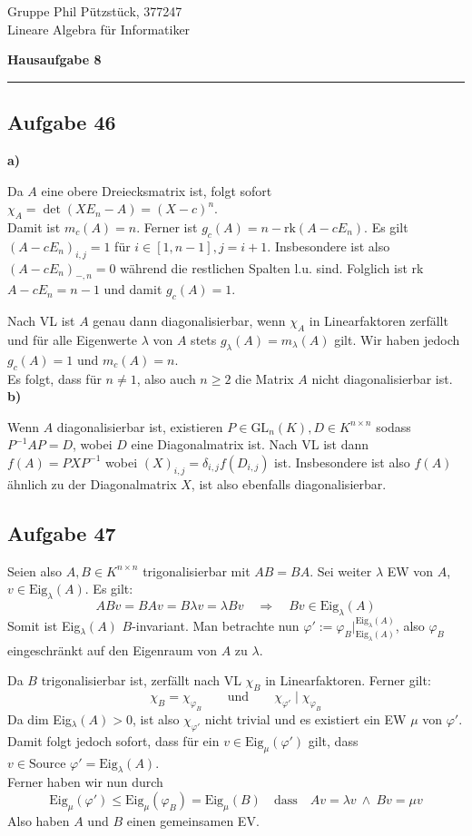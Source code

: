 \documentclass[a4paper,graphics,11pt]{article}
\newcommand{\aufgabe}[1]{\subsection*{Aufgabe #1}}
\begin{document}
\noindent Gruppe              \hfill Phil Pützstück, 377247\\
\noindent Lineare Algebra für Informatiker\\
\begin{center}
	\LARGE{\textbf{Hausaufgabe 8}}
\end{center}
\begin{center}
\rule[0.1ex]{\textwidth}{1pt}
\end{center}



\aufgabe{46}
\textbf{a)}

Da $A$ eine obere Dreiecksmatrix ist, folgt sofort $\chi_A = \det(XE_n - A) = (X-c)^n$.\\
Damit ist $m_c(A) = n$. Ferner ist $g_c(A) = n - \text{rk}(A - cE_n)$.
Es gilt $(A-cE_n)_{i,j} = 1$ für $i \in [1,n-1], j=i+1$. Insbesondere
ist also $(A-cE_n)_{-,n} = 0$ während die restlichen Spalten l.u. sind.
Folglich ist rk $A-cE_n = n-1$ und damit $g_c(A) = 1$.

Nach VL ist $A$ genau dann diagonalisierbar, wenn $\chi_A$ in Linearfaktoren zerfällt
und für alle Eigenwerte $\lambda$ von $A$ stets $g_\lambda(A) = m_\lambda(A)$ gilt.
Wir haben jedoch $g_c(A) = 1$ und $m_c(A) = n$.\\
Es folgt, dass für $n \neq 1$, also auch $n \geq 2$ die Matrix $A$ nicht diagonalisierbar ist.\\

\textbf{b)}

Wenn $A$ diagonalisierbar ist, existieren $P \in \text{GL}_n(K), D \in K^{n\times n}$
sodass $P^{-1}AP = D$, wobei $D$ eine Diagonalmatrix ist. Nach
VL ist dann $f(A) = PXP^{-1}$ wobei $(X)_{i,j} = \delta_{i,j}f(D_{i,j})$ ist.
Insbesondere ist also $f(A)$ ähnlich zu der Diagonalmatrix $X$, ist also
ebenfalls diagonalisierbar.

\aufgabe{47}
Seien also $A,B \in K^{n\times n}$ trigonalisierbar mit $AB = BA$. Sei weiter
$\lambda$ EW von $A$, $v \in \text{Eig}_\lambda(A)$. Es gilt:
$$
    ABv = BAv = B\lambda v = \lambda Bv \quad\Longrightarrow\quad Bv \in \text{Eig}_\lambda(A)
$$
Somit ist Eig$_\lambda(A)$ $B$-invariant.
Man betrachte nun $\varphi' := \varphi_B|_{\text{Eig}_\lambda(A)}^{\text{Eig}_\lambda(A)}$, also $\varphi_B$ eingeschränkt auf den Eigenraum von $A$ zu $\lambda$.

Da $B$ trigonalisierbar ist, zerfällt nach VL $\chi_B$ in Linearfaktoren. Ferner gilt:
$$
    \chi_B = \chi_{\varphi_B}
    \qquad\text{und}\qquad
    \chi_{\varphi'} \mid \chi_{\varphi_B}
$$
Da dim Eig$_\lambda(A) > 0$, ist also $\chi_{\varphi'}$ nicht trivial und es existiert
ein EW $\mu$ von $\varphi'$. Damit folgt jedoch sofort,
dass für ein $v \in \text{Eig}_\mu(\varphi')$ gilt, dass $v \in \text{Source }\varphi' = \text{Eig}_\lambda(A)$.\\
Ferner haben wir nun durch
$$
    \text{Eig}_\mu(\varphi') \leq \text{Eig}_\mu(\varphi_B) = \text{Eig}_\mu(B)
    \quad\text{dass}\quad
    Av = \lambda v\ \land\ Bv = \mu v
$$
Also haben $A$ und $B$ einen gemeinsamen EV.
\end{document}
